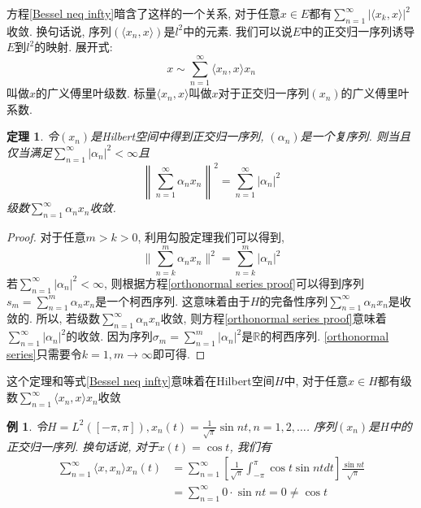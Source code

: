 \documentclass[a4paper,11pt]{article}
\newtheorem{theorem}{\hspace{2em}定理}[section]
\newtheorem{proof}{证明}[section]
\newtheorem{example}{例}[section]
\begin{document}
\indent 方程\ref{Bessel neq infty}暗含了这样的一个关系, 对于任意$x\in E$都有$\sum_{n=1}^{\infty}|\langle x_k,x\rangle|^2$收敛. 换句话说, 序列$(\langle x_n,x\rangle)$是$l^2$中的元素. 我们可以说$E$中的正交归一序列诱导$E$到$l^2$的映射. 展开式:
\begin{equation}\label{expansion}
  x\sim\sum_{n=1}^{\infty}\langle x_n,x\rangle x_n
\end{equation}
叫做$x$的广义傅里叶级数. 标量$\langle x_n,x\rangle$叫做$x$对于正交归一序列$(x_n)$的广义傅里叶系数.
\begin{theorem}\label{norm in orthonormal}
  令$(x_n)$是Hilbert空间中得到正交归一序列, $(\alpha_n)$是一个复序列. 则当且仅当满足$\sum_{n=1}^{\infty}|\alpha_n|^2<\infty$且
  \begin{equation}\label{orthonormal series}
    \left\|\sum_{n=1}^{\infty}\alpha_n x_n\right\|^2=\sum_{n=1}^{\infty}|\alpha_n|^2
  \end{equation}
级数$\sum_{n=1}^{\infty}\alpha_n x_n$收敛.
\end{theorem}
\begin{proof}
  对于任意$m>k>0$, 利用勾股定理我们可以得到,
  \begin{equation}\label{orthonormal series proof}
    \|\sum_{n=k}^{m}\alpha_n x_n\|^2=\sum_{n=k}^{m}|\alpha_n|^2
  \end{equation}
  若$\sum_{n=1}^{\infty}|\alpha_n|^2<\infty$, 则根据方程\eqref{orthonormal series proof}可以得到序列$s_m=\sum_{n=1}^{m}\alpha_n x_n$是一个柯西序列. 这意味着由于$H$的完备性序列$\sum_{n=1}^{\infty}\alpha_n x_n$是收敛的.
  \indent 所以, 若级数$\sum_{n=1}^{\infty}\alpha_n x_n$收敛, 则方程\eqref{orthonormal series proof}意味着$\sum_{n=1}^{\infty}|\alpha_n|^2$的收敛. 因为序列$\sigma_m=\sum_{n=1}^{m}|\alpha_n|^2$是$\mathbb{R}$的柯西序列.
  \eqref{orthonormal series}只需要令$k=1,m\to\infty$即可得.
\end{proof}
这个定理和等式\eqref{Bessel neq infty}意味着在Hilbert空间$H$中, 对于任意$x\in H$都有级数$\sum_{n=1}^{\infty}\langle x_n,x\rangle x_n$收敛
\begin{example}
  令$H=L^2([-\pi,\pi]),x_n(t)=\frac{1}{\sqrt{\pi}}\sin nt,n=1,2,\dots$. 序列$(x_n)$是$H$中的正交归一序列. 换句话说, 对于$x(t)=\cos t$, 我们有
  \begin{equation*}
  \begin{split}
     \sum_{n=1}^{\infty}\langle x,x_n\rangle x_n(t)&=\sum_{n=1}^{\infty}\left[\frac{1}{\sqrt{\pi}}\int_{-\pi}^{\pi}\cos t\sin ntdt\right]\frac{\sin nt}{\sqrt{\pi}} \\
       &=\sum_{n=1}^{\infty}0\cdot \sin nt=0\neq\cos t
  \end{split}
  \end{equation*}
\end{example}
\end{document}
